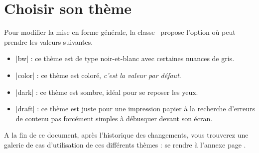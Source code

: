 \documentclass[10pt, a4paper]{tutodoc}
\begin{document}
\section{Choisir son thème}

Pour modifier la mise en forme générale, la classe \thisproj\ propose l'option  où  peut prendre les valeurs suivantes.

\begin{itemize}
    \item \tdocinlatex|bw| :
    ce thème est de type noir-et-blanc avec certaines nuances de gris.

    \item \tdocinlatex|color| :
    ce thème est coloré, \emph{c'est la valeur par défaut}.

    \item \tdocinlatex|dark| :
    ce thème est sombre, idéal pour se reposer les yeux.

    \item \tdocinlatex|draft| :
    ce thème est juste pour une impression papier à la recherche d'erreurs de contenu pas forcément simples à débusquer devant son écran.
\end{itemize}


\begin{tdocnote}
	A la fin de ce document, après l'historique des changements, vous trouverez une galerie de cas d'utilisation de ces différents thèmes : se rendre à l'annexe page \pageref{tutodoc-theme-gallery}.
\end{tdocnote}
\end{document}
